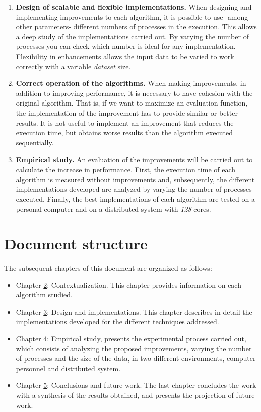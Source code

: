 	\begin{enumerate}		
		\item \textbf{Design of scalable and flexible implementations.} When designing and implementing improvements to each algorithm, it is possible to use -among other parameters- different numbers of processes in the execution. This allows a deep study of the implementations carried out. By varying the number of processes you can check which number is ideal for any implementation. Flexibility in enhancements allows the input data to be varied to work correctly with a variable \textit{dataset} size.
		\item \textbf{Correct operation of the algorithms.} When making improvements, in addition to improving performance, it is necessary to have cohesion with the original algorithm. That is, if we want to maximize an evaluation function, the implementation of the improvement has to provide similar or better results. It is not useful to implement an improvement that reduces the execution time, but obtains worse results than the algorithm executed sequentially.
		\item \textbf{Empirical study.} An evaluation of the improvements will be carried out to calculate the increase in performance. First, the execution time of each algorithm is measured without improvements and, subsequently, the different implementations developed are analyzed by varying the number of processes executed. Finally, the best implementations of each algorithm are tested on a personal computer and on a distributed system with \textit{128} cores.
	\end{enumerate}





\section{Document structure}
	The subsequent chapters of this document are organized as follows:	
	\begin{itemize}		
		\item Chapter \hyperref[cap:c2_context]{2}: Contextualization. This chapter provides information on each algorithm studied.
		\item Chapter \hyperref[cap:c3_implementaciones]{3}: Design and implementations. This chapter describes in detail the implementations developed for the different techniques addressed.
		\item Chapter \hyperref[cap:c4_estudio]{4}: Empirical study, presents the experimental process carried out, which consists of analyzing the proposed improvements, varying the number of processes and the size of the data, in two different environments, computer personnel and distributed system.
		\item Chapter \hyperref[cap:c5_conclu]{5}: Conclusions and future work. The last chapter concludes the work with a synthesis of the results obtained, and presents the projection of future work.
	\end{itemize}


